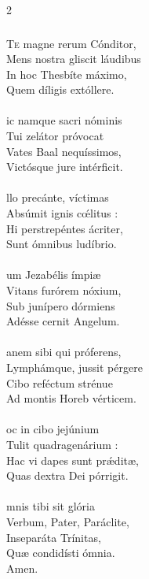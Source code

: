 \documentclass[9pt,twoside]{extarticle}
\begin{document}
\begin{multicols}{2}
{{\subsubsection*{\center {}}
\lettrine{T}e magne rerum Cónditor,\\
Mens nostra gliscit láudibus\\
In hoc Thesbíte máximo,\\
Quem díligis extóllere.\\
\\
ic namque sacri nóminis\\
Tui zelátor próvocat\\
Vates Baal nequíssimos,\\
Victósque jure intérficit.\\
\\
llo precánte, víctimas\\
Absúmit ignis cœ́litus :\\
Hi perstrepéntes ácriter,\\
Sunt ómnibus ludíbrio.\\
\\
um Jezabélis ímpiæ\\
Vitans furórem nóxium,\\
Sub junípero dórmiens \\
Adésse cernit Angelum.\\
\\
anem sibi qui próferens,\\
Lymphámque, jussit pérgere\\
Cibo reféctum strénue\\
Ad montis Horeb vérticem.\\
\\
oc in cibo jejúnium\\
Tulit quadragenárium :\\
Hac vi dapes sunt prǽditæ,\\
Quas dextra Dei pórrigit.\\
\\
mnis tibi sit glória\\
Verbum, Pater, Paráclite,\\
Inseparáta Trínitas,\\
Quæ condidísti ómnia.\\
Amen.

}}
\end{multicols}
\end{document}
